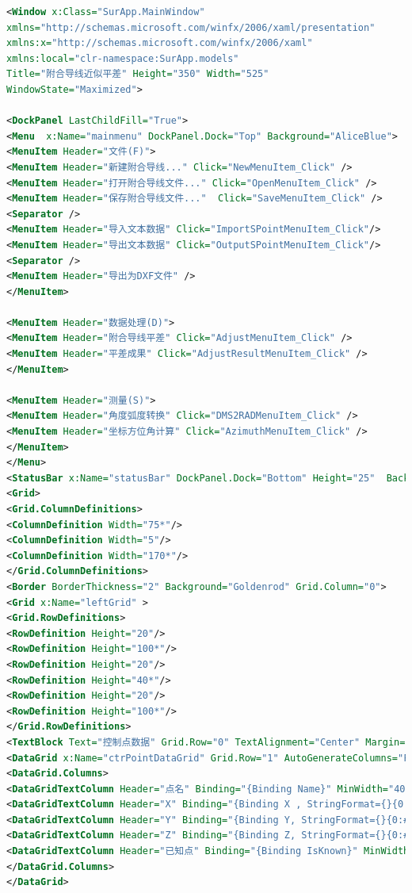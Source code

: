  \begin{lstlisting}[language=xml]
<Window x:Class="SurApp.MainWindow"
xmlns="http://schemas.microsoft.com/winfx/2006/xaml/presentation"
xmlns:x="http://schemas.microsoft.com/winfx/2006/xaml"
xmlns:local="clr-namespace:SurApp.models"
Title="附合导线近似平差" Height="350" Width="525"
WindowState="Maximized">

<DockPanel LastChildFill="True">
<Menu  x:Name="mainmenu" DockPanel.Dock="Top" Background="AliceBlue">
<MenuItem Header="文件(F)">
<MenuItem Header="新建附合导线..." Click="NewMenuItem_Click" />
<MenuItem Header="打开附合导线文件..." Click="OpenMenuItem_Click" />
<MenuItem Header="保存附合导线文件..."  Click="SaveMenuItem_Click" />
<Separator />
<MenuItem Header="导入文本数据" Click="ImportSPointMenuItem_Click"/>
<MenuItem Header="导出文本数据" Click="OutputSPointMenuItem_Click"/>
<Separator />
<MenuItem Header="导出为DXF文件" />
</MenuItem>

<MenuItem Header="数据处理(D)">
<MenuItem Header="附合导线平差" Click="AdjustMenuItem_Click" />
<MenuItem Header="平差成果" Click="AdjustResultMenuItem_Click" />
</MenuItem>

<MenuItem Header="测量(S)">
<MenuItem Header="角度弧度转换" Click="DMS2RADMenuItem_Click" />
<MenuItem Header="坐标方位角计算" Click="AzimuthMenuItem_Click" />
</MenuItem>
</Menu>
<StatusBar x:Name="statusBar" DockPanel.Dock="Bottom" Height="25"  Background="AliceBlue"/>
<Grid>
<Grid.ColumnDefinitions>
<ColumnDefinition Width="75*"/>
<ColumnDefinition Width="5"/>
<ColumnDefinition Width="170*"/>
</Grid.ColumnDefinitions>
<Border BorderThickness="2" Background="Goldenrod" Grid.Column="0">
<Grid x:Name="leftGrid" >
<Grid.RowDefinitions>
<RowDefinition Height="20"/>
<RowDefinition Height="100*"/>
<RowDefinition Height="20"/>
<RowDefinition Height="40*"/>
<RowDefinition Height="20"/>
<RowDefinition Height="100*"/>
</Grid.RowDefinitions>
<TextBlock Text="控制点数据" Grid.Row="0" TextAlignment="Center" Margin="2" />
<DataGrid x:Name="ctrPointDataGrid" Grid.Row="1" AutoGenerateColumns="False" Margin="2" ItemsSource="{Binding CtrPoints}" >
<DataGrid.Columns>
<DataGridTextColumn Header="点名" Binding="{Binding Name}" MinWidth="40"/>
<DataGridTextColumn Header="X" Binding="{Binding X , StringFormat={}{0:##0.###}}" MinWidth="60"/>
<DataGridTextColumn Header="Y" Binding="{Binding Y, StringFormat={}{0:##0.###}}" MinWidth="60" />
<DataGridTextColumn Header="Z" Binding="{Binding Z, StringFormat={}{0:##0.###}}" MinWidth="60"/>
<DataGridTextColumn Header="已知点" Binding="{Binding IsKnown}" MinWidth="30"/>
</DataGrid.Columns>
</DataGrid>


\end{lstlisting}

